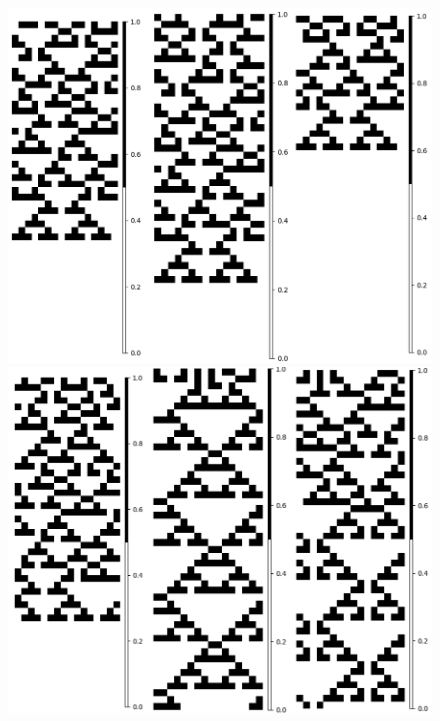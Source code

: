\documentclass[11pt]{article}
\begin{document}
			\begin{figure}[H]
			\centering
			\includegraphics[scale=0.3]{resources/Atractores22/atractor_22_size_16_res.png}
			\includegraphics[scale=0.3]{resources/Atractores22/atractor_22_size_16_res1.png}

\end{figure}
\end{document}

